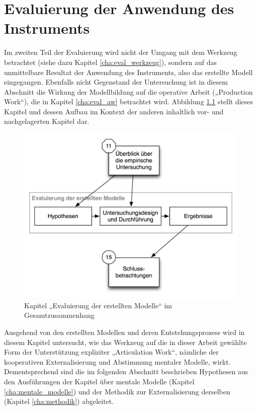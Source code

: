 

\chapter{Evaluierung der Anwendung des Instruments} %
\label{cha:eval_modell}

Im zweiten Teil der Evaluierung wird nicht der Umgang mit dem Werkzeug betrachtet (siehe dazu Kapitel \ref{cha:eval_werkzeug}), sondern auf das unmittelbare Resultat der Anwendung des Instruments, also das erstellte Modell eingegangen. Ebenfalls nicht Gegenstand der Untersuchung ist in diesem Abschnitt die Wirkung der Modellbildung auf die operative Arbeit („Production Work“), die in Kapitel \ref{cha:eval_aw} betrachtet wird. Abbildung \ref{fig:img_Kontextgrafiken_k13} stellt dieses Kapitel und dessen Aufbau im Kontext der anderen inhaltlich vor- und nachgelagerten Kapitel dar.


\begin{figure}[htbp]
	\centering
		\includegraphics[scale=0.6]{img/Kontextgrafiken/k13.png}
	\caption{Kapitel „Evaluierung der erstellten Modelle“ im Gesamtzusammenhang}
	\label{fig:img_Kontextgrafiken_k13}
\end{figure}


Ausgehend von den erstellten Modellen und deren Entstehungsprozess wird in diesem Kapitel untersucht, wie das Werkzeug auf die in dieser Arbeit gewählte Form der Unterstützung expliziter „Articulation Work“, nämliche der kooperativen Externalisierung und Abstimmung mentaler Modelle, wirkt. Dementsprechend sind die im folgenden Abschnitt beschrieben Hypothesen aus den Ausführungen der Kapitel über mentale Modelle (Kapitel \ref{cha:mentale_modelle}) und der Methodik zur Externalisierung derselben (Kapitel \ref{cha:methodik}) abgeleitet. 

